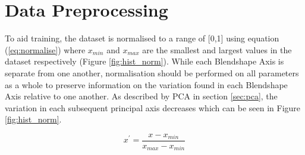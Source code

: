 \section{Data Preprocessing}
To aid training, the dataset is normalised to a range of [0,1] using equation (\ref{eq:normalise}) where $x_{min}$ and $x_{max}$ are the smallest and largest values in the dataset respectively (Figure \ref{fig:hist_norm}).
While each Blendshape Axis is separate from one another, normalisation should be performed on all parameters as a whole to preserve information on the variation found in each Blendshape Axis relative to one another.
As described by PCA in section \ref{sec:pca}, the variation in each subsequent principal axis decreases which can be seen in Figure \ref{fig:hist_norm}.

\begin{equation} \label{eq:normalise}
   x^\prime = \frac{x - x_{min}}{x_{max} - x_{min}} 
\end{equation}


